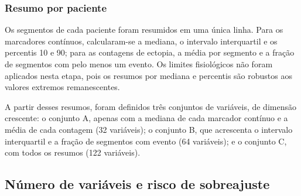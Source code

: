 \begin{table}[h!]
	\captionsetup{width=13cm}
\end{table}

\subsubsection{Resumo por paciente}

Os segmentos de cada paciente foram resumidos em uma única linha. Para os
marcadores contínuos, calcularam-se a mediana, o intervalo interquartil e os
percentis 10 e 90; para as contagens de ectopia, a média por segmento e a
fração de segmentos com pelo menos um evento. Os limites fisiológicos não
foram aplicados nesta etapa, pois os resumos por mediana e percentis são
robustos aos valores extremos remanescentes.

A partir desses resumos, foram definidos três conjuntos de variáveis, de
dimensão crescente: o conjunto A, apenas com a mediana de cada marcador
contínuo e a média de cada contagem (32 variáveis); o conjunto B, que
acrescenta o intervalo interquartil e a fração de segmentos com evento
(64 variáveis); e o conjunto C, com todos os resumos (122 variáveis).

\subsection{Número de variáveis e risco de sobreajuste}
\label{subsec:met-numero-variaveis}

